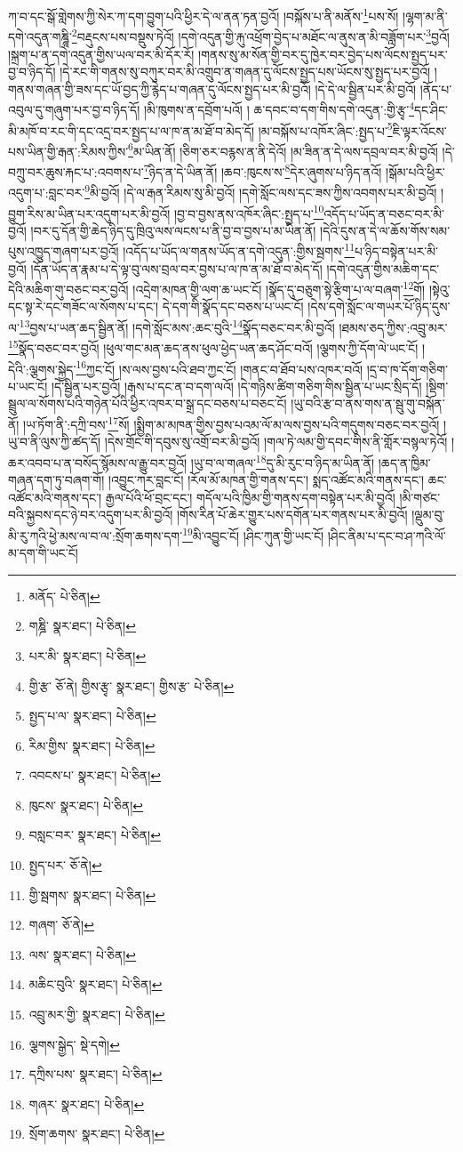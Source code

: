 ཀ་བ་དང་སྒོ་གླེགས་ཀྱི་སེར་ཀ་དག་བྱུག་པའི་ཕྱིར་དེ་ལ་ནན་ཏན་བྱའོ། །བསྐོས་པ་ནི་མནོས་\footnote{མནོད་  པེ་ཅིན། }པས་སོ། །ལྷག་མ་ནི་དགེ་འདུན་གཎྜཱི་\footnote{གཎྜི་  སྣར་ཐང་།  པེ་ཅིན། }བརྡུངས་པས་བསྡུས་ཏེའོ། །དགེ་འདུན་གྱི་རྐུ་འཕྲོག་བྱེད་པ་མཐོང་ལ་ནུས་ན་མི་བཟློག་པར་\footnote{པར་མི་  སྣར་ཐང་།  པེ་ཅིན། }བྱའོ། །སྐྲག་པ་ན་དགེ་འདུན་གྱིས་ཡལ་བར་མི་དོར་རོ། །གནས་སུ་མ་སོན་གྱི་བར་དུ་ཁྱེར་བར་བྱེད་པས་ལོངས་སྤྱད་པར་བྱ་བ་ཉིད་དོ། །དེ་རང་གི་གནས་སུ་བཀུར་བར་མི་འགྲུབ་ན་གཞན་དུ་ལོངས་སྤྱད་པས་ཡོངས་སུ་སྤྱད་པར་བྱའོ། །གནས་གཞན་གྱི་ཟས་དང་ཡོ་བྱད་ཀྱི་རྙེད་པ་གཞན་དུ་ལོངས་སྤྱད་པར་མི་བྱའོ། །དེ་དེ་ལ་སྦྱིན་པར་མི་བྱའོ། །ནོད་པ་འབུལ་དུ་གཞུག་པར་བྱ་བ་ཉིད་དོ། །མི་ཁུགས་ན་དབྲོག་པའོ། །
ཆ་དབང་བ་དག་གིས་དགེ་འདུན་:གྱི་རྩྭ་\footnote{གྱི་རྩ་  ཅོ་ནེ། གྱིས་རྩྭ་  སྣར་ཐང་། གྱིས་རྩ་  པེ་ཅིན། }དང་ཤིང་མི་མཁོ་བ་རང་གི་དང་འདྲ་བར་སྤྱད་པ་ལ་ཁ་ན་མ་ཐོ་བ་མེད་དོ། །མ་བསྐོས་པ་འཁོར་ཞིང་:སྤྱད་པ་\footnote{སྤྱད་པ་ལ་  སྣར་ཐང་།  པེ་ཅིན། }ཇི་ལྟར་འོངས་པས་ཡིན་གྱི་རྒན་:རིམས་ཀྱིས་\footnote{རིམ་གྱིས་  སྣར་ཐང་།  པེ་ཅིན། }མ་ཡིན་ནོ། །ཅིག་ཅར་བརྙས་ན་ནི་དེའོ། །མ་ཟིན་ན་དེ་ལས་དབྲལ་བར་མི་བྱའོ། །དེ་བཀྲུ་བར་ཆུས་རྐང་པ་:འབགས་པ་\footnote{འབངས་པ་  སྣར་ཐང་།  པེ་ཅིན། }ཉིད་ན་དེ་ཡིན་ནོ། །ཆབ་:ཁུངས་ས་\footnote{ཁུངས་  སྣར་ཐང་།  པེ་ཅིན། }དེར་ཞུགས་པ་ཉིད་ནའོ། །སྒོམ་པའི་ཕྱིར་འདུག་པ་:བླང་བར་\footnote{བསླང་བར་  སྣར་ཐང་།  པེ་ཅིན། }མི་བྱའོ། །དེ་ལ་རྒན་རིམས་སུ་མི་བྱའོ། །དགེ་སློང་ལས་དང་ཟས་ཀྱིས་འབགས་པར་མི་བྱའོ། །བྱུག་རིས་མ་ཡིན་པར་འདུག་པར་མི་བྱའོ། །བྱ་བ་བྱས་ནས་འཁོར་ཞིང་:སྤྱད་པ་\footnote{སྤྱད་པར་  ཅོ་ནེ། }འདོད་པ་ཡོད་ན་བཅང་བར་མི་བྱའོ། །བར་དུ་དོན་གྱི་ཆེད་ཉིད་དུ་ཁྲིའུ་ལས་ལངས་པ་ནི་བྱ་བ་བྱས་པ་མ་ཡིན་ནོ། །དེའི་དུས་ན་དེ་ལ་ཆོས་གོས་སམ་པུས་འཁྱུད་གཞག་པར་བྱའོ། །འདོད་པ་ཡོད་ལ་གནས་ཡོད་ན་དགེ་འདུན་:གྱིས་སྦགས་\footnote{གྱི་སྦགས་  སྣར་ཐང་།  པེ་ཅིན། }པ་ཉིད་བསྟེན་པར་མི་བྱའོ། །དོན་ཡོད་ན་རྣམ་པ་དེ་ལྟ་བུ་ལས་བྲལ་བར་བྱས་པ་ལ་ཁ་ན་མ་ཐོ་བ་མེད་དོ། །དགེ་འདུན་གྱིས་མཆིག་དང་དེའི་མཆིག་གུ་བཅང་བར་བྱའོ། །འདྲེག་མཁན་གྱི་ལག་ཆ་ཡང་ངོ། །སྣོད་དུ་བཅུག་སྟེ་རྩིག་པ་ལ་བཞག་\footnote{གཞག་  ཅོ་ནེ། }གོ། །སྟེའུ་དང་སྟ་རེ་དང་གཟོང་ལ་སོགས་པ་དང་། དེ་དག་གི་སྣོད་དང་བཅས་པ་ཡང་ངོ། །དེས་དགེ་སློང་ལ་གཡར་པོ་ཉིད་དུས་ལ་\footnote{ལས་  སྣར་ཐང་།  པེ་ཅིན། }བྱས་པ་ཡན་ཆད་སྦྱིན་ནོ། །དགེ་སློང་མས་:ཆང་བུའི་\footnote{མཆིང་བུའི་  སྣར་ཐང་།  པེ་ཅིན། }སྣོད་བཅང་བར་མི་བྱའོ། །ཐམས་ཅད་ཀྱིས་:འབྲུ་མར་\footnote{འབྲུ་མར་གྱི་  སྣར་ཐང་།  པེ་ཅིན། }སྣོད་བཅང་བར་བྱའོ། །ཕུལ་གང་མན་ཆད་ནས་ཕུལ་ཕྱེད་ཡན་ཆད་ཤོང་བའོ། །ལྕགས་ཀྱི་དོག་ལེ་ཡང་ངོ། །དེའི་:ལྕགས་སྐྱེད་\footnote{ལྕགས་སྒྱེད་  སྡེ་དགེ། }ཀྱང་ངོ། །ས་ལས་བྱས་པའི་ཐབ་ཀྱང་ངོ། །གནང་བ་ཐོབ་པས་འཁར་བའོ། །དྲ་བ་ཁ་དོག་གཅིག་པ་ཡང་ངོ། །དེ་སྦྱིན་པར་བྱའོ། །རྒས་པ་དང་ན་བ་དག་ལའོ། །དེ་གཉིས་ཚིག་གཅིག་གིས་སྦྱིན་པ་ཡང་སྲིད་དོ། །སྡིག་སྦྲུལ་ལ་སོགས་པའི་གཉེན་པོའི་ཕྱིར་འཁར་བ་སྒྲ་དང་བཅས་པ་བཅང་ངོ། །ཡུ་བའི་རྩ་བ་ནས་གས་ན་སྦུ་གུ་བསྐོན་ནོ། །ཡ་ཏོག་ནི་:དཀྲི་བས་\footnote{དཀྲིས་པས་  སྣར་ཐང་།  པེ་ཅིན། }སོ། །སྨྱིག་མ་མཁན་གྱིས་བྱས་པའམ་ལོ་མ་ལས་བྱས་པའི་གདུགས་བཅང་བར་བྱའོ། །ཡུ་བ་ནི་ལུས་ཀྱི་ཚད་དོ། །དེས་གྲོང་གི་དབུས་སུ་འགྲོ་བར་མི་བྱའོ། །གལ་ཏེ་ལམ་གྱི་དབང་གིས་ནི་གློར་བསྙལ་ཏེའོ། །ཆར་འབབ་པ་ན་བསོད་སྙོམས་ལ་རྒྱུ་བར་བྱའོ། །ཡུ་བ་ལ་གཞལ་\footnote{གཞར་  སྣར་ཐང་།  པེ་ཅིན། }དུ་མི་རུང་བ་ཉིད་མ་ཡིན་ནོ། །ཆད་ན་ཁྱིམ་གཞན་དག་ཏུ་བཞག་གོ། །འབྱུང་ཀར་བླང་ངོ། །རོལ་མོ་མཁན་གྱི་གནས་དང་། སྨད་འཚོང་མའི་གནས་དང་། ཆང་འཚོང་མའི་གནས་དང་། རྒྱལ་པོའི་ཕོ་བྲང་དང་། གདོལ་པའི་ཁྱིམ་གྱི་གནས་དག་བསྟེན་པར་མི་བྱའོ། །མི་གཙང་བའི་སྐྱབས་དང་ཉེ་བར་འདུག་པར་མི་བྱའོ། །གོས་རིན་པོ་ཆེར་གྱུར་པས་དགོན་པར་གནས་པར་མི་བྱའོ། །ལྡུམ་བུ་མི་རུ་ཀའི་ཕྱེ་མས་ལ་བ་ལ་:སྲོག་ཆགས་དག་\footnote{སྲོག་ཆགས་  སྣར་ཐང་།  པེ་ཅིན། }མི་འབྱུང་ངོ། །ཤིང་ཀུན་གྱི་ཡང་ངོ། །ཤིང་ནིམ་པ་དང་བ་ཤ་ཀའི་ལོ་མ་དག་གི་ཡང་ངོ། 